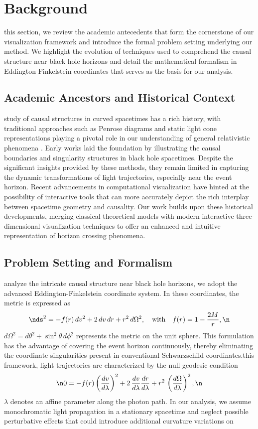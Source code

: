 \documentclass{article}
\begin{document}
\section{Background}\nIn this section, we review the academic antecedents that form the cornerstone of our visualization framework and introduce the formal problem setting underlying our method. We highlight the evolution of techniques used to comprehend the causal structure near black hole horizons and detail the mathematical formalism in Eddington-Finkelstein coordinates that serves as the basis for our analysis.\n\n\subsection{Academic Ancestors and Historical Context}\nThe study of causal structures in curved spacetimes has a rich history, with traditional approaches such as Penrose diagrams and static light cone representations playing a pivotal role in our understanding of general relativistic phenomena \cite{ref1}. Early works laid the foundation by illustrating the causal boundaries and singularity structures in black hole spacetimes. Despite the significant insights provided by these methods, they remain limited in capturing the dynamic transformations of light trajectories, especially near the event horizon. Recent advancements in computational visualization have hinted at the possibility of interactive tools that can more accurately depict the rich interplay between spacetime geometry and causality. Our work builds upon these historical developments, merging classical theoretical models with modern interactive three-dimensional visualization techniques to offer an enhanced and intuitive representation of horizon crossing phenomena.\n\n\subsection{Problem Setting and Formalism}\nTo analyze the intricate causal structure near black hole horizons, we adopt the advanced Eddington-Finkelstein coordinate system. In these coordinates, the metric is expressed as\n\begin{equation}\nds^2 = -f(r)\, dv^2 + 2\, dv\, dr + r^2\, d\Omega^2, \quad \text{with} \quad f(r)=1-\frac{2M}{r},\n\end{equation}\nwhere \(d\Omega^2 = d\theta^2+\sin^2\theta\, d\phi^2\) represents the metric on the unit sphere. This formulation has the advantage of covering the event horizon continuously, thereby eliminating the coordinate singularities present in conventional Schwarzschild coordinates.\n\nWithin this framework, light trajectories are characterized by the null geodesic condition\n\begin{equation}\n0 = -f(r)\left(\frac{dv}{d\lambda}\right)^2 + 2\,\frac{dv}{d\lambda}\frac{dr}{d\lambda} + r^2\,\left(\frac{d\Omega}{d\lambda}\right)^2, \label{eq:nullgeodesic}\n\end{equation}\nwhere \(\lambda\) denotes an affine parameter along the photon path. In our analysis, we assume monochromatic light propagation in a stationary spacetime and neglect possible perturbative effects that could introduce additional curvature variations on 
\end{document}
